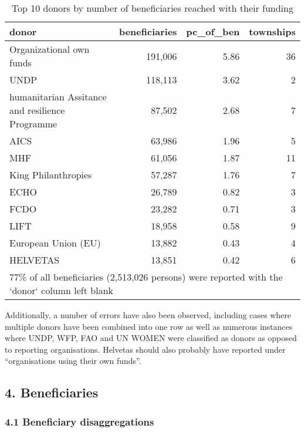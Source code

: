 \documentclass[
]{article}
\begin{document}
\begin{table}

\caption{\label{tab:donor-table}Top 10 donors by number of beneficiaries reached with their funding}
\centering
\begin{tabular}[t]{l|r|r|r}
\hline
donor & beneficiaries & pc\_of\_ben & townships\\
\hline
Organizational own funds & 191,006 & 5.86 & 36\\
\hline
UNDP & 118,113 & 3.62 & 2\\
\hline
humanitarian Assitance and resilience Programme & 87,502 & 2.68 & 7\\
\hline
AICS & 63,986 & 1.96 & 5\\
\hline
MHF & 61,056 & 1.87 & 11\\
\hline
King Philanthropies & 57,287 & 1.76 & 7\\
\hline
ECHO & 26,789 & 0.82 & 3\\
\hline
FCDO & 23,282 & 0.71 & 3\\
\hline
LIFT & 18,958 & 0.58 & 9\\
\hline
European Union (EU) & 13,882 & 0.43 & 4\\
\hline
HELVETAS & 13,851 & 0.42 & 6\\
\hline
\multicolumn{4}{l}{\rule{0pt}{1em}77\% of all beneficiaries (2,513,026 persons) were reported with the `donor` column left blank}\\
\end{tabular}
\end{table}

Additionally, a number of errors have also been observed, including
cases where multiple donors have been combined into one row as well as
numerous instances where UNDP, WFP, FAO and UN WOMEN were classified as
donors as opposed to reporting organisations. Helvetas should also
probably have reported under ``organisations using their own funds''.

\hypertarget{beneficiaries}{%
\subsection{4. Beneficiaries}\label{beneficiaries}}

\hypertarget{beneficiary-disaggregations}{%
\subsubsection{4.1 Beneficiary
disaggregations}\label{beneficiary-disaggregations}}
\end{document}
